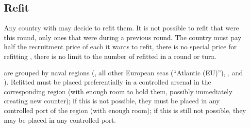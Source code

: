 



\subsection{Refit}
Any country with  \ND may decide to refit them. It is not
possible to refit \ND that were  this round, only ones that
were  during a previous round. The country must pay half the
recruitment price of each \ND it wants to refit, there is no special price for
refitting \FLEET, there is no limit to the number of \ND refitted in a round
or turn.

 \ND are grouped by naval regions (,
all other European seas (``Atlantic (EU)''), ,
 and ). Refitted \ND must be placed
preferentially in a controlled arsenal in the corresponding region (with
enough room to hold them, possibly immediately creating new \FLEET counter);
if this is not possible, they must be placed in any controlled port of the
region (with enough room); if this is still not possible, they may be placed
in any controlled port.

